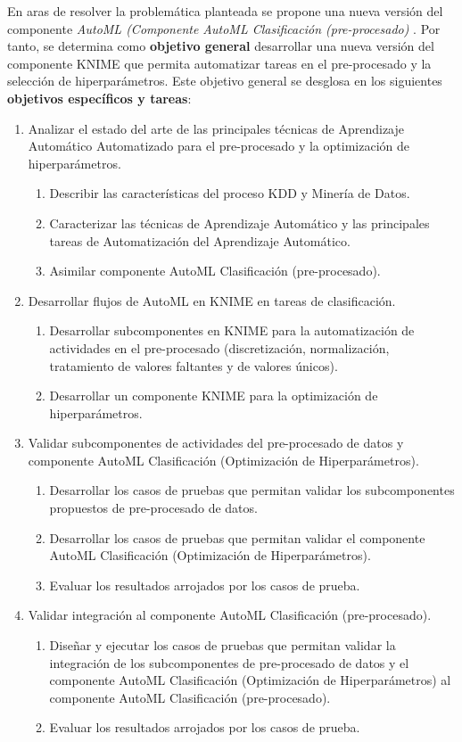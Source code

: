 En aras de resolver la problemática planteada se propone una nueva versión del componente \textit{AutoML (Componente AutoML Clasificación (pre-procesado)} \citep{Carrazana2022}. Por tanto, se determina como \textbf{objetivo general} desarrollar una nueva versión del componente KNIME que permita automatizar tareas en el pre-procesado y la selección de hiperparámetros. Este objetivo general se desglosa en los siguientes \textbf{objetivos específicos y tareas}:

\begin{enumerate}
	\item Analizar el estado del arte de las principales técnicas de Aprendizaje Automático Automatizado para el pre-procesado y la optimización de hiperparámetros.
	\begin{enumerate}
		\item Describir las características del proceso KDD y Minería de Datos. 
		\item Caracterizar las técnicas de Aprendizaje Automático y las principales tareas de Automatización del Aprendizaje Automático.
		\item Asimilar componente AutoML Clasificación (pre-procesado).
	\end{enumerate}
	\item Desarrollar flujos de AutoML en KNIME en tareas de clasificación.
	\begin{enumerate}
		\item Desarrollar subcomponentes en KNIME para la automatización de actividades en el pre-procesado (discretización, normalización, tratamiento de valores faltantes y de valores únicos).
		\item Desarrollar un componente KNIME para la optimización de hiperparámetros.
	\end{enumerate}
	\item Validar subcomponentes de actividades del pre-procesado de datos y componente AutoML Clasificación (Optimización de Hiperparámetros).
	\begin{enumerate}
		\item Desarrollar los casos de pruebas que permitan validar los subcomponentes propuestos de pre-procesado de datos. 
		\item Desarrollar los casos de pruebas que permitan validar el componente AutoML Clasificación (Optimización de Hiperparámetros).
		\item Evaluar los resultados arrojados por los casos de prueba.
	\end{enumerate} 
	\item Validar integración al componente AutoML Clasificación (pre-procesado).
	\begin{enumerate}
		\item Diseñar y ejecutar los casos de pruebas que permitan validar la integración de los subcomponentes de pre-procesado de datos y el componente AutoML Clasificación (Optimización de Hiperparámetros) al componente AutoML Clasificación (pre-procesado).
		\item Evaluar los resultados arrojados por los casos de prueba.
	\end{enumerate}
\end{enumerate}

